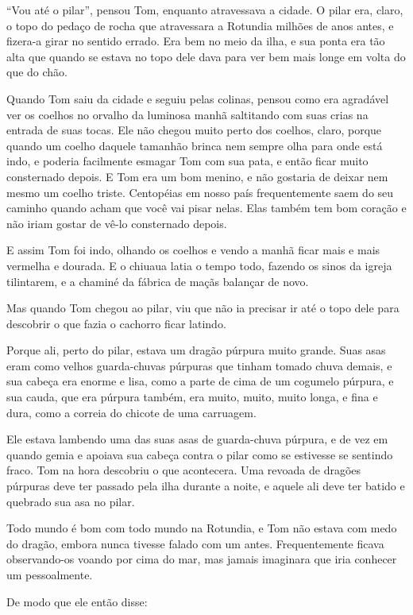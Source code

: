 “Vou até o pilar”, pensou Tom, enquanto atravessava a cidade. O pilar
era, claro, o topo do pedaço de rocha que atravessara a Rotundia
milhões de anos antes, e fizera-a girar no sentido errado. Era bem no
meio da ilha, e sua ponta era tão alta que quando se estava no topo
dele dava para ver bem mais longe em volta do que do chão.

Quando Tom saiu da cidade e seguiu pelas colinas, pensou como era
agradável ver os coelhos no orvalho da luminosa manhã saltitando com
suas crias na entrada de suas tocas. Ele não chegou muito perto dos
coelhos, claro, porque quando um coelho daquele tamanhão brinca nem
sempre olha para onde está indo, e poderia facilmente esmagar Tom com
sua pata, e então ficar muito consternado depois. E Tom era um bom
menino, e não gostaria de deixar nem mesmo um coelho triste.
Centopéias em nosso país frequentemente saem do seu caminho quando
acham que você vai pisar nelas. Elas também tem bom coração e não
iriam gostar de vê-lo consternado depois.

E assim Tom foi indo, olhando os coelhos e vendo a manhã ficar mais e
mais vermelha e dourada. E o chiuaua latia o tempo todo, fazendo os
sinos da igreja tilintarem, e a chaminé da fábrica de maçãs balançar
de novo.

Mas quando Tom chegou ao pilar, viu que não ia precisar ir até o topo
dele para descobrir o que fazia o cachorro ficar latindo.

Porque ali, perto do pilar, estava um dragão púrpura muito grande.
Suas asas eram como velhos guarda-chuvas púrpuras que tinham tomado
chuva demais, e sua cabeça era enorme e lisa, como a parte de cima de
um cogumelo púrpura, e sua cauda, que era púrpura também, era muito,
muito, muito longa, e fina e dura, como a correia do chicote de uma
carruagem.

Ele estava lambendo uma das suas asas de guarda-chuva púrpura, e de
vez em quando gemia e apoiava sua cabeça contra o pilar como se
estivesse se sentindo fraco. Tom na hora descobriu o que acontecera.
Uma revoada de dragões púrpuras deve ter passado pela ilha durante a
noite, e aquele ali deve ter batido e quebrado sua asa no pilar.

Todo mundo é bom com todo mundo na Rotundia, e Tom não estava com medo
do dragão, embora nunca tivesse falado com um antes. Frequentemente
ficava observando-os voando por cima do mar, mas jamais imaginara que
iria conhecer um pessoalmente.

De modo que ele então disse:

